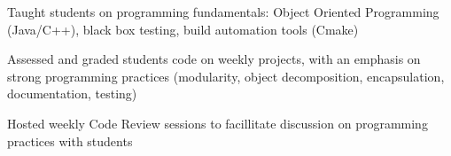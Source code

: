 \begin{cvitemize}
  \item Taught students on programming fundamentals: Object Oriented Programming (Java/C++), black box testing, build automation tools (Cmake)
  \item Assessed and graded students code on weekly projects, with an emphasis on strong programming practices (modularity, object decomposition, encapsulation, documentation, testing)
  \item Hosted weekly Code Review sessions to facillitate discussion on programming practices with students
\end{cvitemize}
